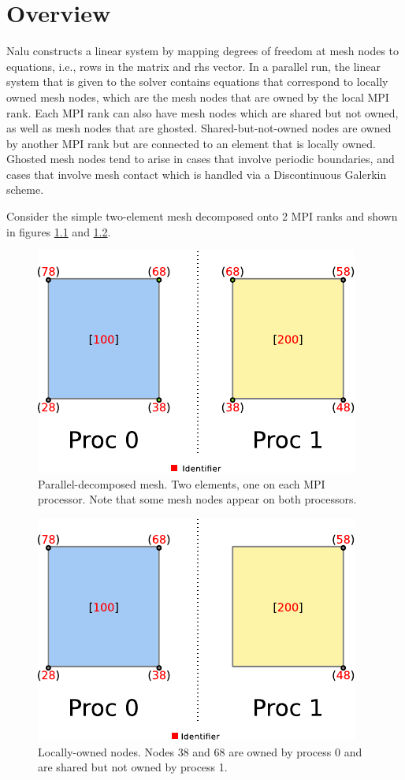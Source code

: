 
\chapter{Overview}
Nalu constructs a linear system by mapping degrees of freedom at mesh nodes
to equations, i.e., rows in the matrix and rhs vector. In a parallel run,
the linear system that is given to the solver contains equations that
correspond to locally owned mesh nodes, which are the mesh nodes that are
owned by the local MPI rank. Each MPI rank can also have mesh nodes which
are shared but not owned, as well as mesh nodes that are ghosted.
 Shared-but-not-owned nodes are owned by another MPI rank but are
connected to an element that is locally owned. Ghosted mesh nodes tend to
arise in cases that involve periodic boundaries, and cases that involve
mesh contact which is handled via a Discontinuous Galerkin scheme.

Consider the simple two-element
mesh decomposed onto 2 MPI ranks and shown in figures \ref{decomp1} and
\ref{locallyowned}.

\begin{figure}[ht]
\centering
\includegraphics{figures/stkMeshUniversalPart.pdf}
\caption{Parallel-decomposed mesh. Two elements, one on each MPI processor.
Note that some mesh nodes appear on both processors.}
\label{decomp1}
\end{figure}

\begin{figure}[ht]
\centering
\includegraphics{figures/stkMeshLocallyOwnedPart.pdf}
\caption{Locally-owned nodes.  Nodes 38 and 68 are owned by process 0 and are 
shared but not owned by process 1.}
\label{locallyowned}
\end{figure}

